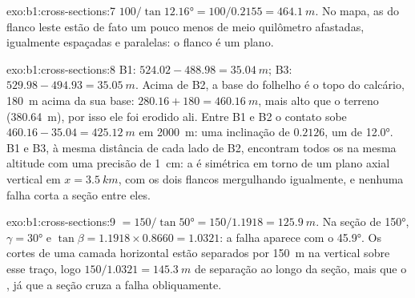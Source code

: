 \begin{solution}{exo:b1:cross-sections:7}
$100/\tan\ang{12.16} = 100/0.2155 = \qty{464.1}{m}$. No mapa, as  do flanco leste estão de fato um pouco menos de meio quilômetro afastadas, igualmente espaçadas e paralelas: o flanco é um plano.
\end{solution}

\begin{solution}{exo:b1:cross-sections:8}
B1: $524.02 - 488.98 = \qty{35.04}{m}$; B3: $529.98 - 494.93 =
\qty{35.05}{m}$. Acima de B2, a base do folhelho é o topo do calcário, \qty{180}{m} acima da sua base: $280.16 + 180 = \qty{460.16}{m}$,
mais alto que o terreno (\qty{380.64}{m}), por isso ele foi erodido ali.
Entre B1 e B2 o contato sobe $460.16 - 35.04 = \qty{425.12}{m}$
em \qty{2000}{m}: uma inclinação de $0.2126$, um  de \ang{12.0}. B1
e B3, à mesma distância de cada lado de B2, encontram todos os  na mesma altitude com uma precisão de \qty{1}{cm}: a  é simétrica em torno de um plano axial vertical em $x = \qty{3.5}{km}$, com os dois flancos mergulhando igualmente, e nenhuma falha corta a seção entre eles.
\end{solution}

\begin{solution}{exo:b1:cross-sections:9}
 $= 150/\tan\ang{50} = 150/1.1918 = \qty{125.9}{m}$. Na seção de
 \ang{150}, $\gamma = \ang{30}$ e $\tan\beta = 1.1918\times0.8660 =
1.0321$: a falha aparece com o  \ang{45.9}. Os cortes de uma camada horizontal estão separados por \qty{150}{m} na vertical sobre esse traço, logo
$150/1.0321 = \qty{145.3}{m}$ de separação ao longo da seção, mais que o , já que a seção cruza a falha obliquamente.
\end{solution}

